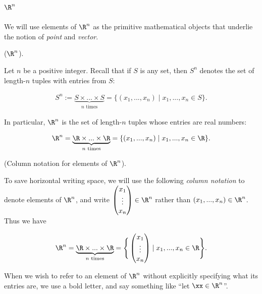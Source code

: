 \newpage

\subsection*{$\R^n$}

We will use elements of $\R^n$ as the primitive mathematical objects that underlie the notion of \textit{point} and \textit{vector}.

\begin{defn}
    ($\R^n$).
    
    Let $n$ be a positive integer. Recall that if $S$ is any set, then $S^n$ denotes the set of length-$n$ tuples with entries from $S$:
    
    \begin{align*}
        S^n := \underbrace{S \times ... \times S}_{\text{$n$ times}} = \{(x_1, ..., x_n) \mid x_1, ..., x_n \in S\}.
    \end{align*}
    
    In particular, $\R^n$ is the set of length-$n$ tuples whose entries are real numbers: 
    
    \begin{align*}
        \R^n = \underbrace{\R \times ... \times \R}_{\text{$n$ times}} = \{(x_1, ..., x_n) \mid x_1, ..., x_n \in \R\}.
    \end{align*}
\end{defn}

\begin{defn}
    (Column notation for elements of $\R^n$).
    
    To save horizontal writing space, we will use the following \textit{column notation} to denote elements of $\R^n$, and write $\begin{pmatrix} x_1 \\ \vdots \\ x_n \end{pmatrix} \in \R^n$ rather than $(x_1, ..., x_n) \in \R^n$. Thus we have
    
    \begin{align*}
        \R^n = \underbrace{\R \times ... \times \R}_{\text{$n$ times}} = \Bigg\{ \begin{pmatrix} x_1 \\ \vdots \\ x_n \end{pmatrix} \mid x_1, ..., x_n \in \R \Bigg\}.
    \end{align*}
    
    When we wish to refer to an element of $\R^n$ without explicitly specifying what its entries are, we use a bold letter, and say something like ``let $\xx \in \R^n$''.
\end{defn}

